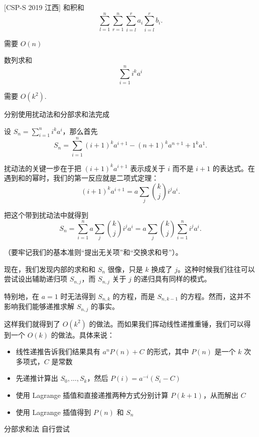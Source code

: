 \begin{frame}{[CSP-S 2019 江西] 和积和}
    $$
    \sum_{l=1}^n\sum_{r=1}^n\sum_{i=l}^ra_i\sum_{i=l}^r b_i.
    $$

    需要 $O(n)$
\end{frame}
\begin{frame}{数列求和}
    $$
    \sum_{i=1}^n i^ka^i
    $$

    需要 $O(k^2)$.

    分别使用扰动法和分部求和法完成
\end{frame}
\begin{frame}
    设 $S_n=\sum_{i=1}^n i^k a^i$，那么首先
    $$
    S_n=\sum_{i=1}^n (i+1)^k a^{i+1} - (n+1)^ka^{n+1}+1^ka^{1}.
    $$

    扰动法的关键一步在于把 $(i+1)^ka^{i+1}$ 表示成关于 $i$ 而不是 $i+1$ 的表达式。在遇到和的幂时，我们的第一反应就是二项式定理：
    $$
    (i+1)^ka^{i+1}=a\sum_j\binom{k}{j}i^ja^i.
    $$ 

    把这个带到扰动法中就得到
    $$
    S_n=\sum_{i=1}^n a\sum_j\binom{k}{j}i^ja^i=a\sum_j\binom{k}{j}\sum_{i=1}^n i^ja^i. 
    $$
    
    （要牢记我们的基本准则“提出无关项”和“交换求和号”）。
\end{frame}
\begin{frame}
    现在，我们发现内部的求和和 $S_n$ 很像，只是 $k$ 换成了 $j$。这种时候我们往往可以尝试设出辅助递归项 $S_{n,j}$，而 $S_{n,j}$ 关于 $j$ 的递归具有同样的模式。

    特别地，在 $a=1$ 时无法得到 $S_{n,k}$ 的方程，而是 $S_{n,k-1}$ 的方程。然而，这并不影响我们能够递推求解 $S_{n,j}$ 的事实。

    这样我们就得到了 $O(k^2)$ 的做法。而如果我们挥动线性递推重锤，我们可以得到一个 $O(k)$ 的做法。具体来说：
    \begin{itemize}
        \item 线性递推告诉我们结果具有 $a^nP(n)+C$ 的形式，其中 $P(n)$ 是一个 $k$ 次多项式，$C$ 是常数
        \item 先递推计算出 $S_0,\ldots,S_k$，然后 $P(i)=a^{-i}(S_i-C)$
        \item 使用 Lagrange 插值和直接递推两种方式分别计算 $P(k+1)$，从而解出 $C$
        \item 使用 Lagrange 插值得到 $P(n)$ 和 $S_n$
    \end{itemize}
\end{frame}
\begin{frame}{分部求和法}
    自行尝试
\end{frame}

